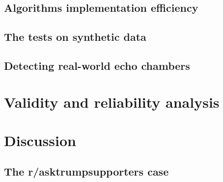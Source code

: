\subsection{Algorithms implementation efficiency}%
\label{sub:algorithm_efficiency}


\subsection{The tests on synthetic data}%
\label{sub:testing_on_synthetic_data}


\subsection{Detecting real-world echo chambers}%
\label{sub:detecting_real_echo_chambers}


\section{Validity and reliability analysis}


\section{Discussion}

\subsection{The r/asktrumpsupporters case}%
\label{sub:the_r_asktrumpsupporters_case}
